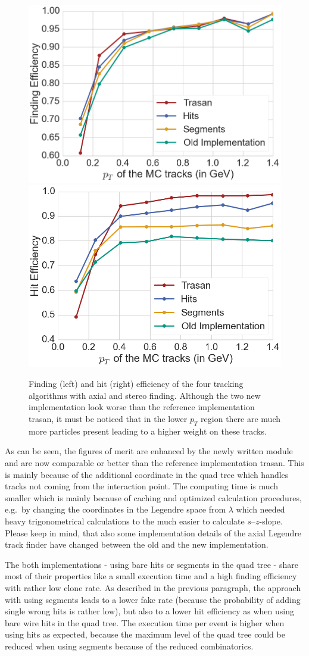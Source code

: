 \begin{figure}
  \includegraphics[width=0.48\linewidth]{figures/workflow/stereo_finding_efficiency.png}
  \includegraphics[width=0.48\linewidth]{figures/workflow/stereo_hit_efficiency.png}
  \caption{Finding (left) and hit (right) efficiency of the four tracking algorithms with axial and stereo finding. Although the two new implementation look worse than the reference implementation trasan, it must be noticed that in the lower $p_T$ region there are much more particles present leading to a higher weight on these tracks.}
  \label{fig-stereo-results}
\end{figure}

As can be seen, the figures of merit are enhanced by the newly written module and are now comparable or better than the reference implementation trasan. This is mainly because of the additional coordinate in the quad tree which handles tracks not coming from the interaction point. The computing time is much smaller which is mainly because of caching and optimized calculation procedures, e.g.\ by changing the coordinates in the Legendre space from $\lambda$ which needed heavy trigonometrical calculations to the much easier to calculate $s$--$z$-slope. Please keep in mind, that also some implementation details of the axial Legendre track finder have changed between the old and the new implementation.

The both implementations - using bare hits or segments in the quad tree - share most of their properties like a small execution time and a high finding efficiency with rather low clone rate. As described in the previous paragraph, the approach with using segments leads to a lower fake rate (because the probability of adding single wrong hits is rather low), but also to a lower hit efficiency as when using bare wire hits in the quad tree. The execution time per event is higher when using hits as expected, because the maximum level of the quad tree could be reduced when using segments because of the reduced combinatorics. 

